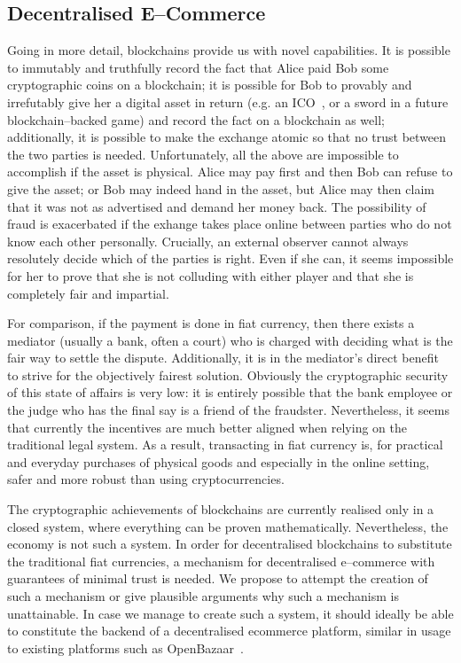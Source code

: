 \subsection{Decentralised E--Commerce}
  Going in more detail, blockchains provide us with novel capabilities. It is possible to
  immutably and truthfully record the fact that Alice paid Bob some cryptographic coins on
  a blockchain; it is possible for Bob to provably and irrefutably give her a digital
  asset in return (e.g. an ICO~\cite{eos}, or a sword in a future blockchain--backed game)
  and record the fact on a blockchain as well; additionally, it is possible to make the
  exchange atomic so that no trust between the two parties is needed. Unfortunately, all
  the above are impossible to accomplish if the asset is physical. Alice may pay first and
  then Bob can refuse to give the asset; or Bob may indeed hand in the asset, but Alice
  may then claim that it was not as advertised and demand her money back. The possibility
  of fraud is exacerbated if the exhange takes place online between parties who do not
  know each other personally. Crucially, an external observer cannot always resolutely
  decide which of the parties is right. Even if she can, it seems impossible for her to
  prove that she is not colluding with either player and that she is completely fair and
  impartial.

  For comparison, if the payment is done in fiat currency, then there exists a mediator
  (usually a bank, often a court) who is charged with deciding what is the fair way to
  settle the dispute. Additionally, it is in the mediator's direct benefit to strive for
  the objectively fairest solution. Obviously the cryptographic security of this state of
  affairs is very low: it is entirely possible that the bank employee or the judge who has
  the final say is a friend of the fraudster. Nevertheless, it seems that currently the
  incentives are much better aligned when relying on the traditional legal system. As a
  result, transacting in fiat currency is, for practical and everyday purchases of
  physical goods and especially in the online setting, safer and more robust than using
  cryptocurrencies.

  The cryptographic achievements of blockchains are currently realised only in a closed
  system, where everything can be proven mathematically. Nevertheless, the economy is not
  such a system. In order for decentralised blockchains to substitute the traditional fiat
  currencies, a mechanism for decentralised e--commerce with guarantees of minimal trust
  is needed. We propose to attempt the creation of such a mechanism or give plausible
  arguments why such a mechanism is unattainable. In case we manage to create such a
  system, it should ideally be able to constitute the backend of a decentralised ecommerce
  platform, similar in usage to existing platforms such as OpenBazaar~\cite{openbazaar}.

